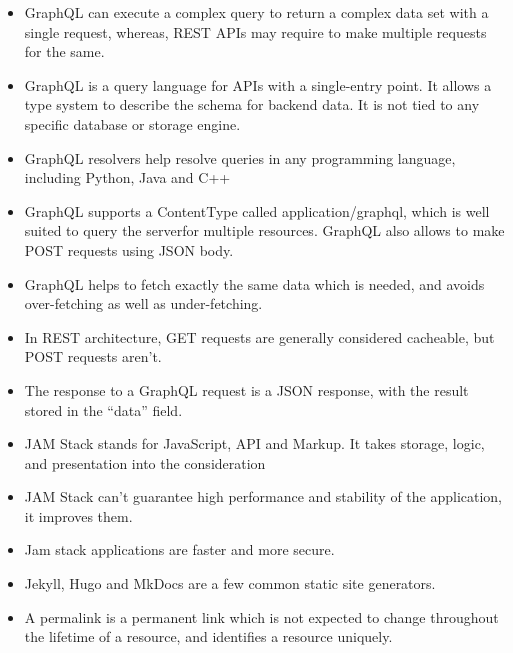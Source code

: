 \documentclass[a4paper]{article}
\begin{document}
\begin{itemize}
\begin{itemize}
    \end{itemize}
    \item GraphQL can execute a complex query to return a complex data set with a single request, whereas, REST APIs may require to make multiple requests for the same. 
    \item GraphQL  is a query language for APIs with a single-entry point. It allows a type system to describe the schema for backend data. It is not tied to any specific database or storage engine.
    \item GraphQL resolvers help resolve queries in any programming language, including Python, Java and C++ 
    \item GraphQL supports a ContentType  called application/graphql, which is well suited to query the serverfor multiple resources. GraphQL also allows to make POST requests using JSON body.
    \item GraphQL helps to fetch exactly the same data which is needed, and avoids over-fetching as well as under-fetching.
    \item In REST architecture, GET requests are generally considered cacheable, but POST requests aren’t.
    \item The response to a GraphQL  request is a JSON response, with the result stored in the “data” field.
    \item JAM Stack stands for JavaScript, API and Markup. It takes storage, logic, and presentation into the consideration
    \item JAM Stack can’t guarantee high performance and stability of the application, it improves them.
    \item Jam stack applications are faster and more secure.
    \item Jekyll, Hugo and MkDocs are a few common static site generators.
    \item A permalink is a permanent link which is not expected to change throughout the lifetime of a resource, and identifies a resource uniquely.
\end{itemize}
\end{document}
